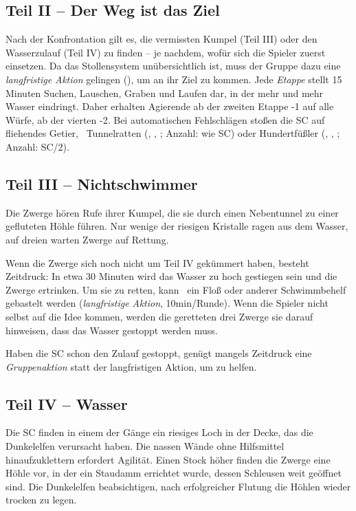 {		\subsection{Teil II -- Der Weg ist das Ziel}

		Nach der Konfrontation gilt es, die vermissten Kumpel (Teil III) oder den Wasserzulauf (Teil IV) zu finden -- je nachdem, wofür sich die Spieler zuerst einsetzen. Da das Stollensystem unübersichtlich ist, muss der Gruppe dazu eine \emph{langfristige Aktion} gelingen (), um an ihr Ziel zu kommen. Jede \emph{Etappe} stellt 15 Minuten Suchen, Lauschen, Graben und Laufen dar, in der mehr und mehr Wasser eindringt. Daher erhalten Agierende ab der zweiten Etappe -1 auf alle Würfe, ab der vierten -2. Bei automatischen Fehlschlägen stoßen die SC auf fliehendes Getier, \zB\ Tunnelratten (, , ; Anzahl: wie SC) oder Hundertfüßler (, , ; Anzahl: SC/2).

		\subsection{Teil III -- Nichtschwimmer}

		Die Zwerge hören Rufe ihrer Kumpel, die sie durch einen Nebentunnel zu einer gefluteten Höhle führen. Nur wenige der riesigen Kristalle ragen aus dem Wasser, auf dreien warten Zwerge auf Rettung.

		Wenn die Zwerge sich noch nicht um Teil IV gekümmert haben, besteht Zeitdruck: In etwa 30 Minuten wird das Wasser zu hoch gestiegen sein und die Zwerge ertrinken. Um sie zu retten, kann \zB\ ein Floß oder anderer Schwimmbehelf gebastelt werden (\emph{langfristige Aktion}, 10min/Runde). Wenn die Spieler nicht selbst auf die Idee kommen, werden die geretteten drei Zwerge sie darauf hinweisen, dass das Wasser gestoppt werden muss.

		Haben die SC schon den Zulauf gestoppt, genügt mangels Zeitdruck eine \emph{Gruppenaktion} statt der langfristigen Aktion, um zu helfen.

		\subsection{Teil IV -- Wasser}

		Die SC finden in einem der Gänge ein riesiges Loch in der Decke, das die Dunkelelfen verursacht haben. Die nassen Wände ohne Hilfsmittel hinaufzuklettern erfordert Agilität. Einen Stock höher finden die Zwerge eine Höhle vor, in der ein Staudamm errichtet wurde, dessen Schleusen weit geöffnet sind. Die Dunkelelfen beabsichtigen, nach erfolgreicher Flutung die Höhlen wieder trocken zu legen.

}

